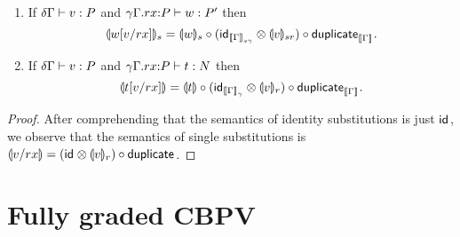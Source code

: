\documentclass[acmsmall,review,anonymous]{acmart}\settopmatter{printfolios=true,printccs=false,printacmref=false}
\theoremstyle{remark}
\begin{document}
\begin{corollary}
  \label{cor:semsinglesub}
  \bla
  \begin{enumerate}
  \item If $\qValTy \delta \Gamma v P$ and
      $\oCompTy {\qext \gamma \Gamma r x P} w {P'}$
      then
\[
  \denv {\qsubst v r x w} s = \denv w s
    \comp (\tid[\Den\Gamma{s\gamma}] \otimes \denv v {sr})
    \comp \duplicate[\den\Gamma]
  .
\]
  \item If $\qValTy \delta \Gamma v P$ and
      $\oCompTy {\qext \gamma \Gamma r x P} t {N}$
      then
\[
  \dent{\qsubst v r x t} = \dent t
    \comp (\tid[\Den\Gamma \gamma] \otimes \denv v r)
    \comp \duplicate[\den\Gamma]
  .
\]
  \end{enumerate}
\end{corollary}
\begin{proof}
  After comprehending that the semantics of identity substitutions is
  just $\tid$, we observe that the semantics of single substitutions
  is $\dent {v/rx} = (\tid \otimes \denv v r) \comp \duplicate$.
\end{proof}





\section{Fully graded CBPV}
\label{sec:full-cbpv}

\newcommand{\peCompTy}[5]{(#1)#2 \vdash #3 : #5 \mid #4}
\newcommand{\qeCompTy}[5]{#1#2 \vdash #3 : #5 \mid #4}
\newcommand{\eext}[4]{#1\mathbin.#2:#4|#3}
\newcommand{\qeext}[6]{#1#2\mathbin.#3#4:#6|#5}
\end{document}
